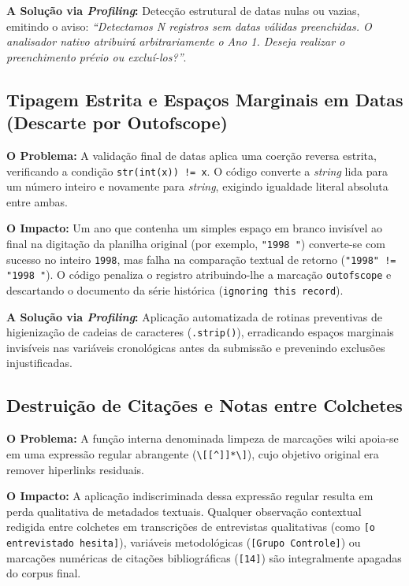\documentclass[
	oneside,
	a4paper,
	12pt,
	chapter=TITLE,
	section=TITLE,
	english,
	brazilian
]{abntex2}
\begin{document}
\begin{apendicesenv}
\textbf{A Solução via \textit{Profiling}:} Detecção estrutural de datas nulas ou vazias, emitindo o aviso: \textit{``Detectamos N registros sem datas válidas preenchidas. O analisador nativo atribuirá arbitrariamente o Ano 1. Deseja realizar o preenchimento prévio ou excluí-los?''}.

\FloatBarrier
\subsection{Tipagem Estrita e Espaços Marginais em Datas (Descarte por Outofscope)}\label{sec:tipagem_estrita_e_espacos_marginais_em_d}


\textbf{O Problema:} A validação final de datas aplica uma coerção reversa estrita, verificando a condição \texttt{str(int(x)) != x}. O código converte a \textit{string} lida para um número inteiro e novamente para \textit{string}, exigindo igualdade literal absoluta entre ambas.

\textbf{O Impacto:} Um ano que contenha um simples espaço em branco invisível ao final na digitação da planilha original (por exemplo, \texttt{"1998 "}) converte-se com sucesso no inteiro \texttt{1998}, mas falha na comparação textual de retorno (\texttt{"1998" != "1998 "}). O código penaliza o registro atribuindo-lhe a marcação \texttt{outofscope} e descartando o documento da série histórica (\texttt{ignoring this record}).

\textbf{A Solução via \textit{Profiling}:} Aplicação automatizada de rotinas preventivas de higienização de cadeias de caracteres (\texttt{.strip()}), erradicando espaços marginais invisíveis nas variáveis cronológicas antes da submissão e prevenindo exclusões injustificadas.

\FloatBarrier
\subsection{Destruição de Citações e Notas entre Colchetes}\label{sec:destruicao_de_citacoes_e_notas_entre_col}


\textbf{O Problema:} A função interna denominada limpeza de marcações wiki apoia-se em uma expressão regular abrangente (\texttt{\textbackslash{}[[\textasciicircum{}]]*\textbackslash{}]}), cujo objetivo original era remover hiperlinks residuais.

\textbf{O Impacto:} A aplicação indiscriminada dessa expressão regular resulta em perda qualitativa de metadados textuais. Qualquer observação contextual redigida entre colchetes em transcrições de entrevistas qualitativas (como \texttt{[o entrevistado hesita]}), variáveis metodológicas (\texttt{[Grupo Controle]}) ou marcações numéricas de citações bibliográficas (\texttt{[14]}) são integralmente apagadas do corpus final.


\end{apendicesenv}
\end{document}
